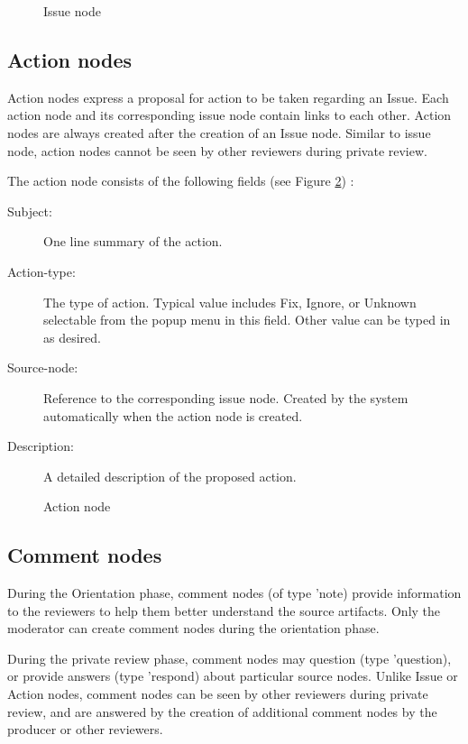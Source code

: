\begin{figure}[htpb]
  {\centerline{}}
  \caption{Issue node}
  \label{issue}
\end{figure}

\subsection {Action nodes}
Action nodes express a proposal for action to be taken regarding an
Issue. Each action node and its corresponding issue node contain links
to each other. Action nodes are always created after the creation of
an Issue node. 
Similar to issue node, action nodes cannot be seen by other reviewers
during private review.

\noindent The action node consists of the following fields (see Figure
\ref{action}) :
\begin{description}
\item [Subject:] One line summary of the action.
\item [Action-type:] The type of  action. Typical value includes 
Fix, Ignore, or Unknown selectable from the popup menu in this field.
Other value can be typed in as desired. 
\item [Source-node:] Reference to the corresponding issue
node. Created by the system automatically when the action node is
created. 
\item [Description:] A detailed description of the proposed action.
\end{description}

\begin{figure}[htpb]
  {\centerline{}}
  \caption{Action node}
  \label{action}
\end{figure}


\subsection {Comment nodes}

During the Orientation phase, comment nodes (of type 'note) provide information
to the reviewers to help them better understand the source artifacts.
Only the moderator can create comment nodes during the orientation phase.

During the private review phase, comment nodes 
may question (type 'question), or provide  
answers (type 'respond) about particular source nodes. 
Unlike Issue or Action nodes, 
comment nodes can be seen by other reviewers during private review,
and are answered by the creation of additional comment nodes by the
producer or other reviewers.

